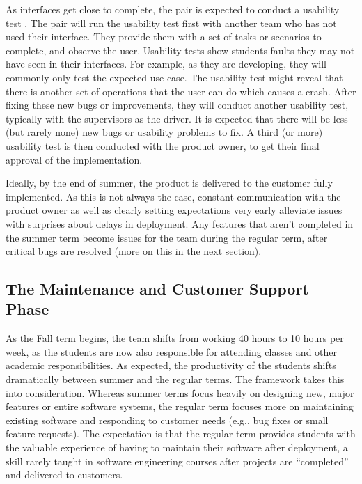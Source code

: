 As interfaces get close to complete, the pair is expected to conduct a usability test \cite{usabilitytesting}. The pair will run the usability test first with another team who has not used their interface. They provide them with a set of tasks or scenarios to complete, and observe the user. Usability tests show students faults they may not have seen in their interfaces. For example, as they are developing, they will commonly only test the expected use case. The usability test might reveal that there is another set of operations that the user can do which causes a crash. After fixing these new bugs or improvements, they will conduct another usability test, typically with the supervisors as the driver. It is expected that there will be less (but rarely none) new bugs or usability problems to fix. A third (or more) usability test is then conducted with the product owner, to get their final approval of the implementation.  

Ideally, by the end of summer, the product is delivered to the customer fully implemented. As this is not always the case, constant communication with the product owner as well as clearly setting expectations very early alleviate issues with surprises about delays in deployment. Any features that aren't completed in the summer term become issues for the team during the regular term, after critical bugs are resolved (more on this in the next section). 


\subsection{The Maintenance and Customer Support Phase}
As the Fall term begins, the team shifts from working 40 hours to 10 hours per week, as the students are now also responsible for attending classes and other academic responsibilities. As expected, the productivity of the students shifts dramatically between summer and the regular terms. The framework takes this into consideration. Whereas summer terms focus heavily on designing new, major features or entire software systems, the regular term focuses more on maintaining existing software and responding to customer needs (e.g., bug fixes or small feature requests). The expectation is that the regular term provides students with the valuable experience of having to maintain their software after deployment, a skill rarely taught in software engineering courses after projects are ``completed'' and delivered to customers.

